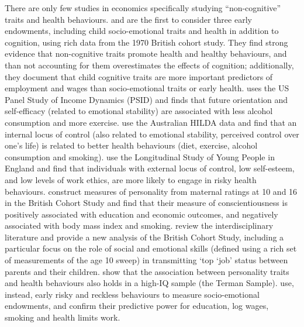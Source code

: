 There are only few studies in economics specifically studying ``non-cognitive'' traits and health behaviours. \citet{Conti2010a} and \citet{Conti2011} are the first to consider three early endowments, including child socio-emotional traits and health in addition to cognition, using rich data from the 1970 British cohort study. They find strong evidence that non-cognitive traits promote health and healthy behaviours, and than not accounting for them overestimates the effects of cognition; additionally, they document that child cognitive traits are more important predictors of employment and wages than socio-emotional traits or early health. \citet{Chiteji2010} uses the US Panel Study of Income Dynamics (PSID) and finds that future orientation and self-efficacy (related to emotional stability) are associated with less alcohol consumption and more exercise. \citet{Cobb-Clark2014} use the Australian HILDA data and find that an internal locus of control (also related to emotional stability, perceived control over one's life) is related to better health behaviours (diet, exercise, alcohol consumption and smoking). \citet{Mendolia2014a} use the Longitudinal Study of Young People in England and find that individuals with external locus of control, low self-esteem, and low levels of work ethics, are more likely to engage in risky health behaviours. \citet{Prevoo2015} construct measures of personality from maternal ratings at 10 and 16 in the British Cohort Study and find that their measure of conscientiousness is positively associated with education and economic outcomes, and negatively associated with body mass index and smoking. \citet{Goodman2015} review the interdisciplinary literature and provide a new analysis of the British Cohort Study, including a particular focus on the role of social and emotional skills (defined using a rich set of measurements of the age 10 sweep) in transmitting `top `job' status between parents and their children. \citet{Savelyev2019} show that the association between personality traits and health behaviours also holds in a high-IQ sample (the Terman Sample). \citet{Heckman2018} use, instead, early risky and reckless behaviours to measure socio-emotional endowments, and confirm their predictive power for education, log wages, smoking and health limits work.

